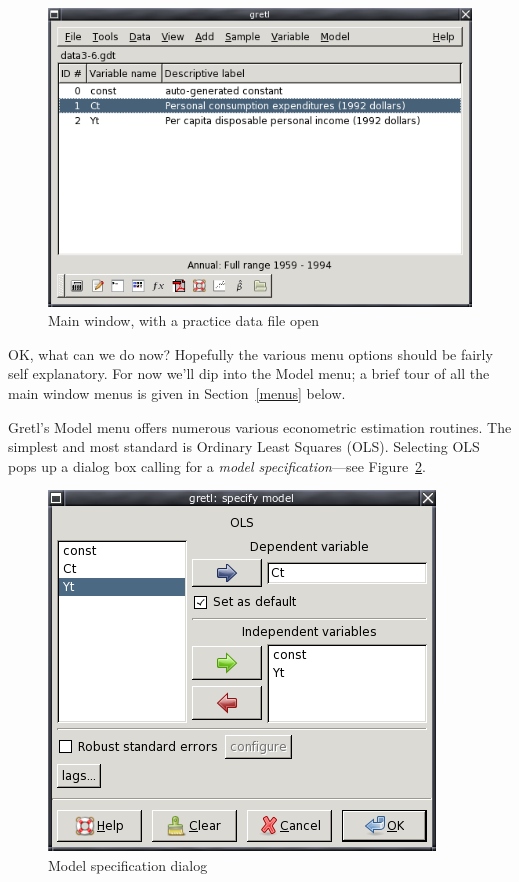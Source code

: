 \begin{figure}[htbp]
  \begin{center}
    \includegraphics[scale=0.5]{figures/mainwin}
  \end{center}
  \caption{Main window, with a practice data file open}
  \label{fig-mainwin}
\end{figure}

OK, what can we do now?  Hopefully the various menu options should be
fairly self explanatory.  For now we'll dip into the Model menu; a
brief tour of all the main window menus is given in
Section~\ref{menus} below.
    
Gretl's Model menu offers numerous various econometric estimation
routines.  The simplest and most standard is Ordinary Least Squares
(OLS). Selecting OLS pops up a dialog box calling for a \emph{model
  specification}---see Figure~\ref{fig-selector}.
    
\begin{figure}[htbp]
  \begin{center}
    \includegraphics[scale=0.5]{figures/selector}
  \end{center}
  \caption{Model specification dialog}
  \label{fig-selector}
\end{figure}

